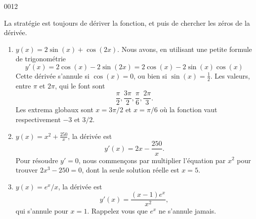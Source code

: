 \begin{corrige}{0012}

La stratégie est toujours de dériver la fonction, et puis de chercher les zéros de la dérivée.

\begin{enumerate}

\item
$y(x)=2\sin(x)+\cos(2x)$. Nous avons, en utilisant une petite formule de trigonométrie 
\begin{equation}
	y'(x)=2\cos(x)-2\sin(2x)=2\cos(x)-2\sin(x)\cos(x)
\end{equation}
Cette dérivée s'annule si $\cos(x)=0$, ou bien si $\sin(x)=\frac{ 1 }{2}$. Les valeurs, entre $\pi$ et $2\pi$, qui le font sont
\begin{equation}
	\frac{ \pi }{ 2 },\frac{ 3\pi }{2},\frac{ \pi }{ 6 },\frac{ 2\pi }{ 3 }.
\end{equation}
Les extrema globaux sont $x=3\pi/2$ et $x=\pi/6$ où la fonction vaut respectivement $-3$ et $3/2$.

\item
$y(x)=x^2+\frac{ 250 }{ x }$, la dérivée est
\begin{equation}
	y'(x)=2x-\frac{ 250 }{ x }.
\end{equation}
Pour résoudre $y'=0$, nous commençons par multiplier l'équation par $x^2$ pour trouver $2x^3-250=0$, dont la seule solution réelle est $x=5$.

\item
$y(x)=e^x/x$, la dérivée est
\begin{equation}
	y'(x)=\frac{ (x-1) e^{x} }{ x^2 },
\end{equation}
qui s'annule pour $x=1$. Rappelez vous que $e^x$ ne s'annule jamais.
\end{enumerate}


\end{corrige}

